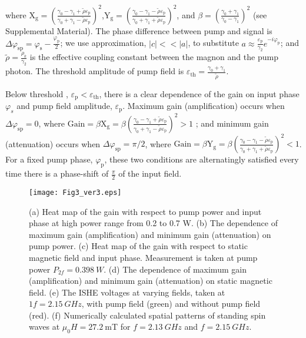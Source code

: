 \documentclass[%
 reprint,
 amsmath,amssymb,
 aps,
prb,
]{revtex4-2}
\begin{document}
where $\mathrm{X}_\mathrm{g}=\left(\frac{\gamma_0-\gamma_1+\tilde{\rho}\varepsilon_{\mathrm{p}}}{\gamma_0+\gamma_1-\tilde{\rho}\varepsilon_{\mathrm{p}}}\right)^2$,$\mathrm{Y}_\mathrm{g}=\left(\frac{\gamma_0-\gamma_1-\tilde{\rho}\varepsilon_{\mathrm{p}}}{\gamma_0+\gamma_1+\tilde{\rho}\varepsilon_\mathrm{p}}\right)^2$, and  $\beta = \left(\frac{\gamma_0+\gamma_1}{\gamma_0-\gamma_1}\right)^2$ (see Supplemental Material).
The phase difference between pump and signal is $\Delta\varphi_\mathrm{sp}=\varphi_\mathrm{s}-\frac{\varphi_\mathrm{p}}{2}$;  we use approximation, $|c| << |a| $, to substitute $a\approx\frac{\varepsilon_\mathrm{p}}{\gamma_2}e^{-i\varphi_\mathrm{p}}$; and $\tilde{\rho}=\frac{\rho_k}{\gamma_2}$ is the effective coupling constant between the magnon and the pump photon. The threshold  amplitude of pump field is $\varepsilon_{\mathrm{th}}=\frac{\gamma_0 + \gamma_1}{\tilde{\rho}}$.

Below threshold , $\varepsilon_\mathrm{p}<\varepsilon_{\mathrm{th}}$, there is a clear dependence of the gain on input phase $\varphi_s$ and pump field amplitude, $\varepsilon_\mathrm{p}$. Maximum gain (amplification) occurs when $\Delta\varphi_\mathrm{sp} = 0$, where $\mathrm{Gain}=\beta \mathrm{X}_\mathrm{g}=\beta \left(\frac{\gamma_0-\gamma_1+\tilde{\rho}\varepsilon_{\mathrm{p}}}{\gamma_0+\gamma_1-\tilde{\rho}\varepsilon_{\mathrm{p}}}\right)^2>1$ ; and minimum gain (attenuation) occurs when $\Delta\varphi_\mathrm{sp}=\pi/2$, where $ \mathrm{Gain}=\beta \mathrm{Y}_\mathrm{g}=\beta \left(\frac{\gamma_0-\gamma_1-\tilde{\rho}\varepsilon_{\mathrm{p}}}{\gamma_0+\gamma_1+\tilde{\rho}\varepsilon_\mathrm{p}}\right)^2<1$. 
For a fixed pump phase, $\varphi_\mathrm{p} $, these two conditions are alternatingly satisfied every time there is a phase-shift of $\frac{\pi}{2}$ of the input field.

\begin{figure}
    \texttt{[image: Fig3\_ver3.eps]}
    \caption{\label{fig:epsart} (a) Heat map of the gain with respect to pump power and input phase at high power range from 0.2 to 0.7 W. (b) The dependence of maximum gain (amplification) and minimum gain (attenuation) on pump power. (c) Heat map of the gain with respect to static magnetic field and input phase. Measurement is taken at pump power $P_{2f}=0.398\ \si{W}$. (d) The dependence of maximum gain (amplification) and minimum gain (attenuation) on static magnetic field. (e) The ISHE voltages at varying fields, taken at $1f= 2.15\ \si{GHz}$, with pump field (green) and without pump field (red). (f) Numerically calculated spatial patterns of standing spin waves at $\mu_0H=27.2\ $mT for $f= 2.13\ \si{GHz}$ and $f= 2.15\ \si{GHz}$.}
\end{figure}
\end{document}
